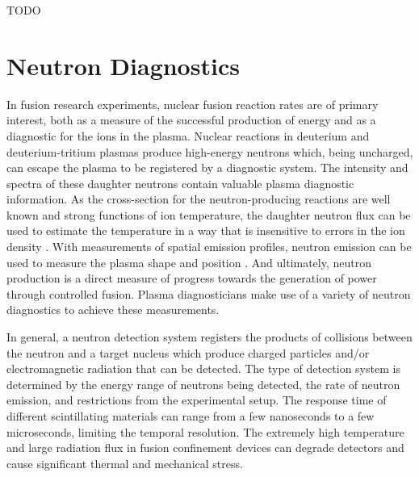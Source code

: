 \documentclass{jpp}
\begin{document}
{\Large TODO \par}

\section{Neutron Diagnostics}

In fusion research experiments, nuclear fusion reaction rates are of primary interest, both as a measure of the successful production of energy and as a diagnostic for the ions in the plasma. Nuclear reactions in deuterium and deuterium-tritium plasmas produce high-energy neutrons which, being uncharged, can escape the plasma to be registered by a diagnostic system. The intensity and spectra of these daughter neutrons contain valuable plasma diagnostic information. As the cross-section for the neutron-producing reactions are well known and strong functions of ion temperature, the daughter neutron flux can be used to estimate the temperature in a way that is insensitive to errors in the ion density \citep[p. 371]{Hutchinson_2002}. With measurements of spatial emission profiles, neutron emission can be used to measure the plasma shape and position \citep{Bielecki2019}. And ultimately, neutron production is a direct measure of progress towards the generation of power through controlled fusion. Plasma diagnosticians make use of a variety of neutron diagnostics to achieve these measurements.

In general, a neutron detection system registers the products of collisions between the neutron and a target nucleus which produce charged particles and/or electromagnetic radiation that can be detected. The type of detection system is determined by the energy range of neutrons being detected, the rate of neutron emission, and restrictions from the experimental setup. The response time of different scintillating materials can range from a few nanoseconds to a few microseconds, limiting the temporal resolution. The extremely high temperature and large radiation flux in fusion confinement devices can degrade detectors and cause significant thermal and mechanical stress.
\end{document}
